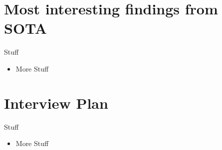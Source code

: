 \documentclass[10pt]{beamer}
\begin{document}

\section{Most interesting findings from SOTA}


\begin{frame}{Stuff}
	\begin{itemize}
        \pause{}
		\item More Stuff
	\end{itemize}	
\end{frame}


\section{Interview Plan}


\begin{frame}{Stuff}
	\begin{itemize}
        \pause{}
		\item More Stuff
	\end{itemize}	
\end{frame}

 
  

\end{document}
